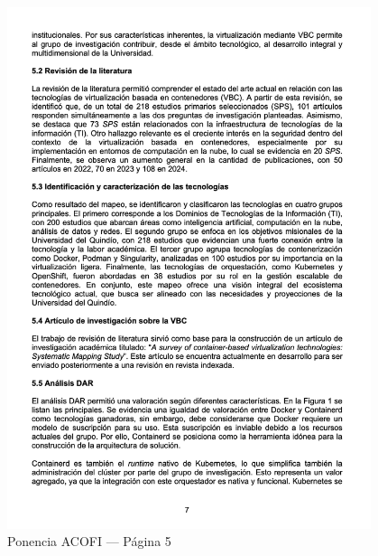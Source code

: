 \begin{figure}[H]
	\centering
	\begin{tcolorbox}[
			colback=white,
			colframe=gray!50,
			boxrule=1pt,
			arc=2pt,
			boxsep=5pt,
			left=3pt,
			right=3pt,
			top=3pt,
			bottom=3pt,
			drop shadow
		]
		\includegraphics[width=0.95\textwidth,keepaspectratio]{apendices/ACOFI/pagina_5.png}
	\end{tcolorbox}
	\caption{Ponencia ACOFI --- Página 5}\label{fig:acofi-pagina-5}
\end{figure}
\FloatBarrier%
